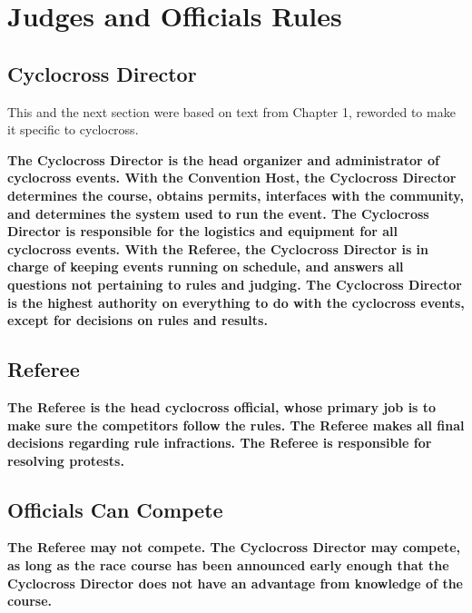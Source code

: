 \chapter{Judges and Officials Rules}

\section{Cyclocross Director}

\begin{framed}
This and the next section were based on text from Chapter 1, reworded to make it specific to cyclocross.
\end{framed}

\textbf{The Cyclocross Director is the head organizer and administrator of cyclocross
events.  With the Convention Host, the Cyclocross Director determines the course,
obtains permits, interfaces with the community, and determines the system
used to run the event.  The Cyclocross Director is responsible for the logistics and
equipment for all cyclocross events.  With the Referee, the
Cyclocross Director is in charge of keeping events running on schedule, and
answers all questions not pertaining to rules and judging.  The Cyclocross
Director is the highest authority on everything to do with the cyclocross
events, except for decisions on rules and results.}

\section{Referee}

\textbf{The Referee is the head cyclocross official, whose primary job is to make sure
the competitors follow the rules.  The Referee makes all final decisions
regarding rule infractions. The Referee is responsible for resolving
protests.}

\section{Officials Can Compete}

\textbf{The Referee may not compete.  The Cyclocross Director may compete, as long as the race course has been announced early enough that the Cyclocross Director does not have an advantage from knowledge of the course.}

